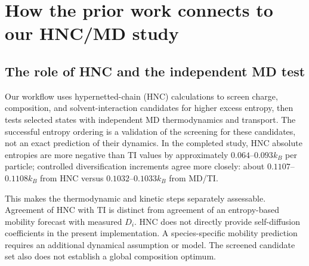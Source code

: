 \documentclass[11pt,a4paper]{article}
\begin{document}
\section{How the prior work connects to our HNC/MD study}
\subsection{The role of HNC and the independent MD test}
Our workflow uses hypernetted-chain (HNC) calculations to screen charge,
composition, and solvent-interaction candidates for higher excess entropy,
then tests selected states with independent MD thermodynamics and transport.
The successful entropy ordering is a validation of the screening for these
candidates, not an exact prediction of their dynamics. In the completed study,
HNC absolute entropies are more negative than TI values by approximately
$0.064$--$0.093k_B$ per particle; controlled diversification increments agree
more closely: about $0.1107$--$0.1108k_B$ from HNC versus
$0.1032$--$0.1033k_B$ from MD/TI.

This makes the thermodynamic and kinetic steps separately assessable.
Agreement of HNC with TI is distinct from agreement of an entropy-based
mobility forecast with measured $D_i$. HNC does not directly provide
self-diffusion coefficients in the present implementation. A species-specific
mobility prediction requires an additional dynamical assumption or model.
The screened candidate set also does not establish a global composition optimum.
\end{document}
